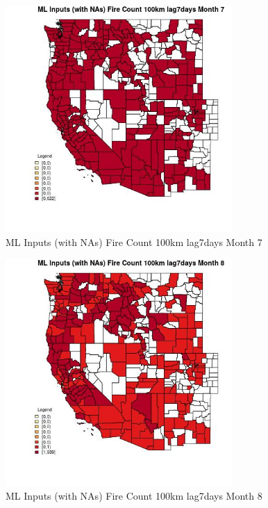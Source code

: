\begin{figure} 
\centering  
\includegraphics[width=0.77\textwidth]{Code_Outputs/Report_ML_input_PM25_Step4_part_e_de_duplicated_aves_compiled_2019-05-21wNAs_CountyFire_Count_100km_lag7daysmedianMonth7.jpg} 
\caption{\label{fig:Report_ML_input_PM25_Step4_part_e_de_duplicated_aves_compiled_2019-05-21wNAsCountyFire_Count_100km_lag7daysmedianMonth7}ML Inputs (with NAs) Fire Count 100km lag7days Month 7} 
\end{figure} 
 

\begin{figure} 
\centering  
\includegraphics[width=0.77\textwidth]{Code_Outputs/Report_ML_input_PM25_Step4_part_e_de_duplicated_aves_compiled_2019-05-21wNAs_CountyFire_Count_100km_lag7daysmedianMonth8.jpg} 
\caption{\label{fig:Report_ML_input_PM25_Step4_part_e_de_duplicated_aves_compiled_2019-05-21wNAsCountyFire_Count_100km_lag7daysmedianMonth8}ML Inputs (with NAs) Fire Count 100km lag7days Month 8} 
\end{figure} 
 


